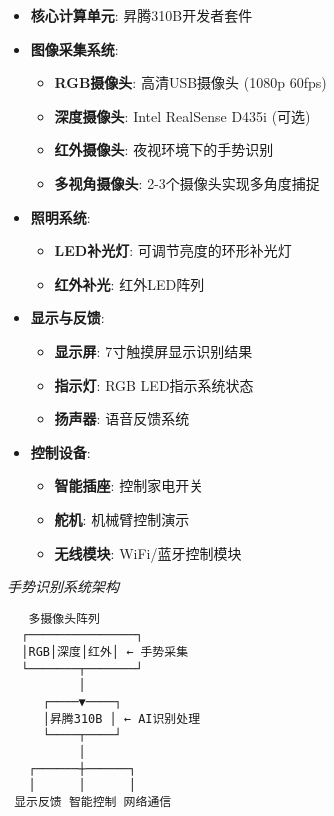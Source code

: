 \begin{itemize}
\tightlist
\item
  \textbf{核心计算单元}: 昇腾310B开发者套件
\item
  \textbf{图像采集系统}:

  \begin{itemize}
  \tightlist
  \item
    \textbf{RGB摄像头}: 高清USB摄像头 (1080p 60fps)
  \item
    \textbf{深度摄像头}: Intel RealSense D435i (可选)
  \item
    \textbf{红外摄像头}: 夜视环境下的手势识别
  \item
    \textbf{多视角摄像头}: 2-3个摄像头实现多角度捕捉
  \end{itemize}
\item
  \textbf{照明系统}:

  \begin{itemize}
  \tightlist
  \item
    \textbf{LED补光灯}: 可调节亮度的环形补光灯
  \item
    \textbf{红外补光}: 红外LED阵列
  \end{itemize}
\item
  \textbf{显示与反馈}:

  \begin{itemize}
  \tightlist
  \item
    \textbf{显示屏}: 7寸触摸屏显示识别结果
  \item
    \textbf{指示灯}: RGB LED指示系统状态
  \item
    \textbf{扬声器}: 语音反馈系统
  \end{itemize}
\item
  \textbf{控制设备}:

  \begin{itemize}
  \tightlist
  \item
    \textbf{智能插座}: 控制家电开关
  \item
    \textbf{舵机}: 机械臂控制演示
  \item
    \textbf{无线模块}: WiFi/蓝牙控制模块
  \end{itemize}
\end{itemize}

\emph{手势识别系统架构}

\begin{lstlisting}
   多摄像头阵列
  ┌───────────────┐
  │RGB│深度│红外│ ← 手势采集
  └───────┬───────┘
          │
     ┌────▼────┐
     │昇腾310B │ ← AI识别处理
     └────┬────┘
          │
   ┌──────┼──────┐
   │      │      │
 显示反馈 智能控制 网络通信
\end{lstlisting}

